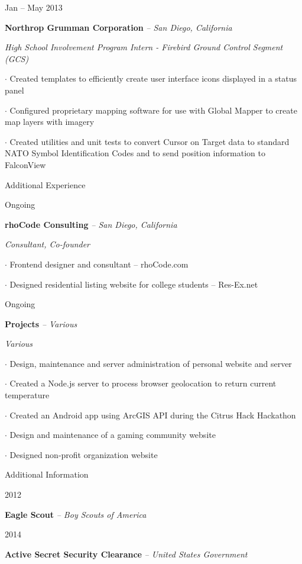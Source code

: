 \documentclass{article}
\newcommand{\entry}[5]{%
	{\fontsize{11pt}{11pt} \parbox{2.75cm}{ #1 } }%
	\parbox[t]{15cm}{%
		\fontsize{11pt}{11pt}\textbf{#2}%
		{\footnotesize\emph{-- #3}}%


		{\fontsize{11pt}{11pt}%
			\emph{#4}%
		}
		
		
		\parbox[t]{14.5cm}{
			\hangparas{0.5cm}{1}
			\fontsize{11pt}{11pt}	#5%
		}
	}
	\vspace{0.2cm}%
}
\renewcommand{\section}[1]{
	\par\vspace{0.1cm}
	{%
		\fontsize{12pt}{12pt}\fontseries{b}\selectfont
		{#1}
	}
	\par\vspace{0.1cm}
}
\begin{document}
\entry
{Jan -- May 2013}
{Northrop Grumman Corporation}
{San Diego, California}
{High School Involvement Program Intern - Firebird Ground Control Segment (GCS)}
{
	$\cdot$ Created templates to efficiently create user interface icons displayed in a status panel

	$\cdot$ Configured proprietary mapping software for use with Global Mapper to create map layers with imagery

	$\cdot$ Created utilities and unit tests to convert Cursor on Target data to standard NATO Symbol Identification Codes and to send position information to FalconView
}


\section{Additional Experience}

\entry
{Ongoing}
{rhoCode Consulting}
{San Diego, California}
{Consultant, Co-founder}
{
	$\cdot$ Frontend designer and consultant -- rhoCode.com

	$\cdot$ Designed residential listing website for college students -- Res-Ex.net
}

\entry
{Ongoing}
{Projects}
{Various}
{Various}
{%
	$\cdot$ Design, maintenance and server administration of personal website and server

	$\cdot$ Created a Node.js server to process browser geolocation to return current temperature

	$\cdot$ Created an Android app using ArcGIS API during the Citrus Hack Hackathon

	$\cdot$ Design and maintenance of a gaming community website

	$\cdot$ Designed non-profit organization website

}


\section{Additional Information}

\entry
{2012}
{Eagle Scout}
{Boy Scouts of America}
{}
{}

\entry
{2014}
{Active Secret Security Clearance}
{United States Government}
{}
{}

\end{document}
